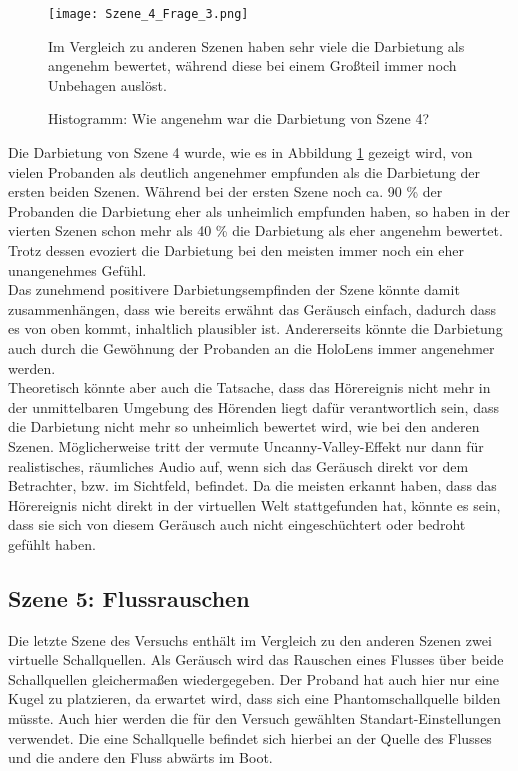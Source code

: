 \begin{figure}[H]
\centering
\texttt{[image: Szene\_4\_Frage\_3.png]}
\caption{Histogramm: Wie angenehm war die Darbietung von Szene 4?}
Im Vergleich zu anderen Szenen haben sehr viele die Darbietung als angenehm bewertet, während diese bei einem Großteil immer noch Unbehagen auslöst.  
\label{fig:Szene_4_Frage3}
\end{figure} 
\vspace*{30pt}
Die Darbietung von Szene 4 wurde, wie es in Abbildung \ref{fig:Szene_4_Frage3} gezeigt wird,  von vielen Probanden als deutlich angenehmer empfunden als die Darbietung der ersten beiden Szenen. Während bei der ersten Szene noch ca. 90 \% der Probanden die Darbietung eher als unheimlich empfunden haben, so haben in der vierten Szenen schon mehr als 40 \% die Darbietung als eher angenehm bewertet. Trotz dessen evoziert die Darbietung bei den meisten immer noch ein eher unangenehmes Gefühl.\\ 

Das zunehmend positivere Darbietungsempfinden der Szene könnte damit zusammenhängen, dass wie bereits erwähnt das Geräusch einfach, dadurch dass es von oben kommt, inhaltlich plausibler ist. Andererseits könnte die Darbietung auch durch die Gewöhnung der Probanden an die HoloLens immer angenehmer werden. \\ 

Theoretisch könnte aber auch die Tatsache, dass das Hörereignis nicht mehr in der unmittelbaren Umgebung des Hörenden liegt dafür verantwortlich sein, dass die Darbietung nicht mehr so unheimlich bewertet wird, wie bei den anderen Szenen. Möglicherweise tritt der vermute \glqq Uncanny-Valley\grqq{}-Effekt nur dann für realistisches, räumliches Audio auf, wenn sich das Geräusch direkt vor dem Betrachter, bzw. im Sichtfeld, befindet. Da die meisten erkannt haben, dass das Hörereignis nicht direkt in der virtuellen Welt stattgefunden hat, könnte es sein, dass sie sich von diesem Geräusch auch nicht eingeschüchtert oder bedroht gefühlt haben.
 
 \subsection{Szene 5: Flussrauschen}
Die letzte Szene des Versuchs enthält im Vergleich zu den anderen Szenen zwei virtuelle Schallquellen. Als Geräusch wird das Rauschen eines Flusses über beide Schallquellen gleichermaßen wiedergegeben. Der Proband hat auch hier nur eine Kugel zu platzieren, da erwartet wird, dass sich eine Phantomschallquelle bilden müsste. Auch hier werden die für den Versuch gewählten Standart-Einstellungen verwendet. Die eine Schallquelle befindet sich hierbei an der Quelle des Flusses und die andere den Fluss abwärts im Boot. \\ 

